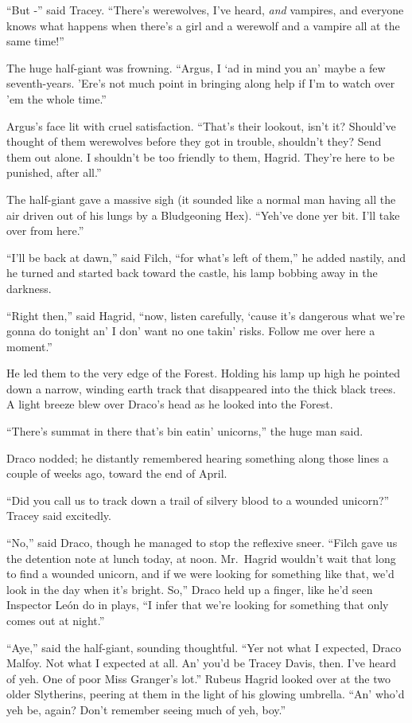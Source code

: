 ``But -'' said Tracey. ``There's werewolves, I've heard, \emph{and}
vampires, and everyone knows what happens when there's a girl and a
werewolf and a vampire all at the same time!''

The huge half-giant was frowning. ``Argus, I `ad in mind you an' maybe a
few seventh-years. 'Ere's not much point in bringing along help if I'm
to watch over 'em the whole time.''

Argus's face lit with cruel satisfaction. ``That's their lookout, isn't
it? Should've thought of them werewolves before they got in trouble,
shouldn't they? Send them out alone. I shouldn't be too friendly to
them, Hagrid. They're here to be punished, after all.''

The half-giant gave a massive sigh (it sounded like a normal man having
all the air driven out of his lungs by a Bludgeoning Hex). ``Yeh've done
yer bit. I'll take over from here.''

``I'll be back at dawn,'' said Filch, ``for what's left of them,'' he
added nastily, and he turned and started back toward the castle, his
lamp bobbing away in the darkness.

``Right then,'' said Hagrid, ``now, listen carefully, `cause it's
dangerous what we're gonna do tonight an' I don' want no one takin'
risks. Follow me over here a moment.''

He led them to the very edge of the Forest. Holding his lamp up high he
pointed down a narrow, winding earth track that disappeared into the
thick black trees. A light breeze blew over Draco's head as he looked
into the Forest.

``There's summat in there that's bin eatin' unicorns,'' the huge man
said.

Draco nodded; he distantly remembered hearing something along those
lines a couple of weeks ago, toward the end of April.

``Did you call us to track down a trail of silvery blood to a wounded
unicorn?'' Tracey said excitedly.

``No,'' said Draco, though he managed to stop the reflexive sneer.
``Filch gave us the detention note at lunch today, at noon. Mr.~Hagrid
wouldn't wait that long to find a wounded unicorn, and if we were
looking for something like that, we'd look in the day when it's bright.
So,'' Draco held up a finger, like he'd seen Inspector León do in plays,
``I infer that we're looking for something that only comes out at
night.''

``Aye,'' said the half-giant, sounding thoughtful. ``Yer not what I
expected, Draco Malfoy. Not what I expected at all. An' you'd be Tracey
Davis, then. I've heard of yeh. One of poor Miss Granger's lot.'' Rubeus
Hagrid looked over at the two older Slytherins, peering at them in the
light of his glowing umbrella. ``An' who'd yeh be, again? Don't remember
seeing much of yeh, boy.''

